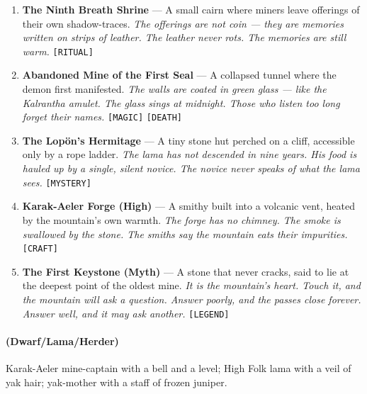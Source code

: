 \begin{enumerate}
\item \textbf{The Ninth Breath Shrine} --- A small cairn where miners leave offerings of their own shadow-traces.
  \hfill \textit{The offerings are not coin --- they are memories written on strips of leather. The leather never rots. The memories are still warm.} \texttt{[RITUAL]}
\item[J] \textbf{Abandoned Mine of the First Seal} --- A collapsed tunnel where the demon first manifested.
  \hfill \textit{The walls are coated in green glass --- like the Kalrantha amulet. The glass sings at midnight. Those who listen too long forget their names.} \texttt{[MAGIC]} \texttt{[DEATH]}
\item[Q] \textbf{The Lopön's Hermitage} --- A tiny stone hut perched on a cliff, accessible only by a rope ladder.
  \hfill \textit{The lama has not descended in nine years. His food is hauled up by a single, silent novice. The novice never speaks of what the lama sees.} \texttt{[MYSTERY]}
\item[K] \textbf{Karak-Aeler Forge (High)} --- A smithy built into a volcanic vent, heated by the mountain's own warmth.
  \hfill \textit{The forge has no chimney. The smoke is swallowed by the stone. The smiths say the mountain eats their impurities.} \texttt{[CRAFT]}
\item[A] \textbf{The First Keystone (Myth)} --- A stone that never cracks, said to lie at the deepest point of the oldest mine.
  \hfill \textit{It is the mountain's heart. Touch it, and the mountain will ask a question. Answer poorly, and the passes close forever. Answer well, and it may ask another.} \texttt{[LEGEND]}
\end{enumerate}

\paragraph*{(Dwarf/Lama/Herder)} Karak-Aeler mine-captain with a bell and a level; High Folk lama with a veil of yak hair; yak-mother with a staff of frozen juniper.

